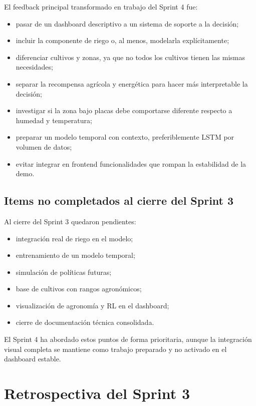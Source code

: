 \documentclass[11pt,a4paper]{article}
\begin{document}
El feedback principal transformado en trabajo del Sprint 4 fue:

\begin{itemize}
    \item pasar de un dashboard descriptivo a un sistema de soporte a la decisión;
    \item incluir la componente de riego o, al menos, modelarla explícitamente;
    \item diferenciar cultivos y zonas, ya que no todos los cultivos tienen las mismas necesidades;
    \item separar la recompensa agrícola y energética para hacer más interpretable la decisión;
    \item investigar si la zona bajo placas debe comportarse diferente respecto a humedad y temperatura;
    \item preparar un modelo temporal con contexto, preferiblemente LSTM por volumen de datos;
    \item evitar integrar en frontend funcionalidades que rompan la estabilidad de la demo.
\end{itemize}

\subsection{Items no completados al cierre del Sprint 3}

Al cierre del Sprint 3 quedaron pendientes:

\begin{itemize}
    \item integración real de riego en el modelo;
    \item entrenamiento de un modelo temporal;
    \item simulación de políticas futuras;
    \item base de cultivos con rangos agronómicos;
    \item visualización de agronomía y RL en el dashboard;
    \item cierre de documentación técnica consolidada.
\end{itemize}

El Sprint 4 ha abordado estos puntos de forma prioritaria, aunque la integración visual completa se mantiene como trabajo preparado y no activado en el dashboard estable.

\newpage

\section{Retrospectiva del Sprint 3}
\end{document}
